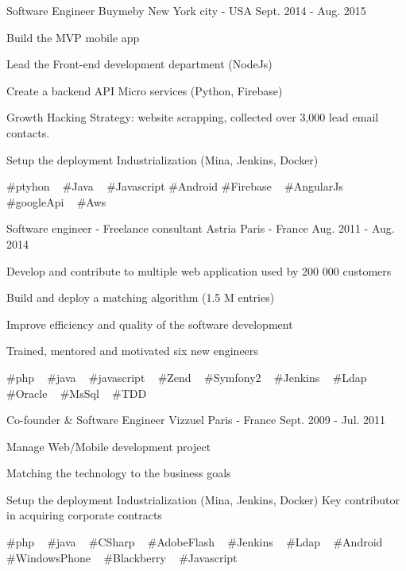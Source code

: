 \begin{cventries}
  \cventry
    {Software Engineer} %
    {Buymeby} %
    {New York city - USA} %
    {Sept. 2014 - Aug. 2015} %
    {
      \begin{cvitems} %
        \item {Build the MVP mobile app}
        \item {Lead the Front-end development department (NodeJs)}
        \item {Create a backend API Micro services (Python, Firebase)}
        \item {Growth Hacking Strategy: website scrapping, collected over 3,000 lead email contacts.}
        \item {Setup the deployment Industrialization (Mina, Jenkins, Docker)}
      \end{cvitems}
    }
    {
      \#ptyhon ~
      \#Java ~
      \#Javascript
      \#Android
      \#Firebase ~
      \#AngularJs ~
      \#googleApi ~
      \#Aws ~
    }

  \cventry
    {Software engineer - Freelance consultant} %
    {Astria} %
    {Paris - France} %
    {Aug. 2011 - Aug. 2014} %
    {
      \begin{cvitems} %
        \item {Develop and contribute to multiple web application used by 200 000 customers}
        \item {Build and deploy a matching algorithm (1.5 M entries)}
        \item {Improve efficiency and quality of the software development}
        \item {Trained, mentored and motivated six new engineers}
      \end{cvitems}
    }
    {
      \#php ~
      \#java ~
      \#javascript ~
      \#Zend ~
      \#Symfony2 ~
      \#Jenkins ~
      \#Ldap ~
      \#Oracle ~
      \#MsSql ~
      \#TDD
    }

  \cventry
    {Co-founder \& Software Engineer} %
    {Vizzuel} %
    {Paris - France} %
    {Sept. 2009 - Jul. 2011} %
    {
      \begin{cvitems} %
        \item {Manage Web/Mobile development project}
        \item {Matching the technology to the business goals}
        \item {Setup the deployment Industrialization (Mina, Jenkins, Docker) Key contributor in acquiring corporate contracts}
      \end{cvitems}
    }
    {
      \#php ~
      \#java ~
      \#CSharp ~
      \#AdobeFlash ~
      \#Jenkins ~
      \#Ldap ~
      \#Android ~
      \#WindowsPhone ~
      \#Blackberry ~
      \#Javascript
    }

\end{cventries}
